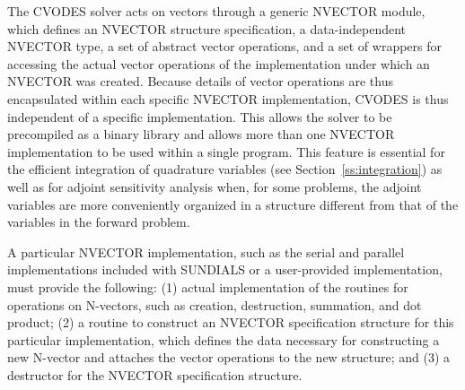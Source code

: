 The CVODES solver acts on vectors through a generic NVECTOR module,
which defines an NVECTOR structure specification, a data-independent
NVECTOR type, a set of abstract vector operations, and a set of
wrappers for accessing the actual vector operations of the
implementation under which an NVECTOR was created. Because details of
vector operations are thus encapsulated within each specific NVECTOR
implementation, CVODES is thus independent of a specific
implementation. This allows the solver to be precompiled as a binary
library and allows more than one NVECTOR implementation to be used
within a single program. This feature is essential for the efficient
integration of quadrature variables (see Section~\ref{ss:integration})
as well as for adjoint sensitivity analysis when, for some problems,
the adjoint variables are more conveniently organized in a structure
different from that of the variables in the forward problem.

A particular NVECTOR implementation, such as the serial and parallel 
implementations included with SUNDIALS or a user-provided implementation,
must provide the following:
(1) actual implementation of the routines for operations on N-vectors, 
such as creation, destruction, summation, and dot product;
(2) a routine to construct an NVECTOR specification structure
for this particular implementation, which defines the data necessary
for constructing a new N-vector and attaches the vector operations
to the new structure; and
(3) a destructor for the NVECTOR specification structure.


